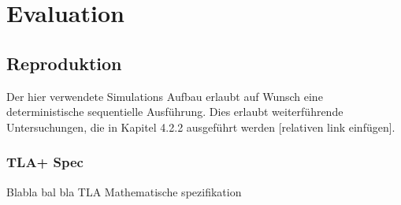 \chapter{Evaluation}

\section{Reproduktion}

Der hier verwendete Simulations Aufbau erlaubt auf Wunsch eine deterministische sequentielle Ausführung. Dies erlaubt weiterführende Untersuchungen, die in Kapitel 4.2.2 ausgeführt werden [relativen link einfügen].

\subsection{TLA+ Spec}
Blabla bal
bla
TLA
Mathematische spezifikation

